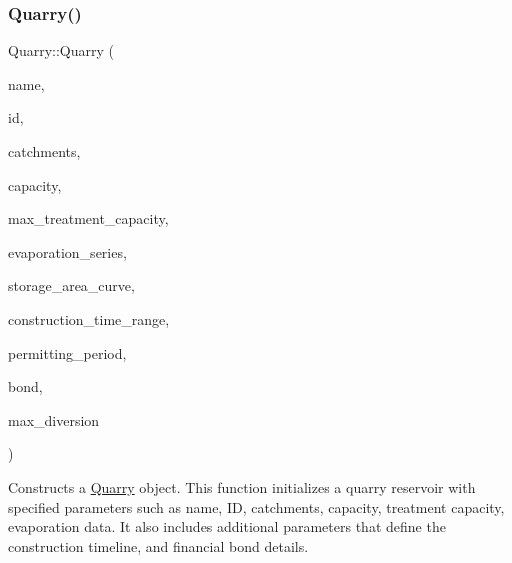 \subsubsection{\texorpdfstring{Quarry()}{Quarry()}\hspace{0.1cm}{\footnotesize\ttfamily [2/5]}}
{\footnotesize\ttfamily Quarry\+::\+Quarry (\begin{DoxyParamCaption}\item[{const char $\ast$}]{name,  }\item[{const int}]{id,  }\item[{const vector$<$ \mbox{\hyperlink{classCatchment}{Catchment}} $\ast$$>$ \&}]{catchments,  }\item[{const double}]{capacity,  }\item[{const double}]{max\+\_\+treatment\+\_\+capacity,  }\item[{\mbox{\hyperlink{classEvaporationSeries}{Evaporation\+Series}} \&}]{evaporation\+\_\+series,  }\item[{\mbox{\hyperlink{classDataSeries}{Data\+Series}} $\ast$}]{storage\+\_\+area\+\_\+curve,  }\item[{const vector$<$ double $>$ \&}]{construction\+\_\+time\+\_\+range,  }\item[{double}]{permitting\+\_\+period,  }\item[{\mbox{\hyperlink{classBond}{Bond}} \&}]{bond,  }\item[{double}]{max\+\_\+diversion }\end{DoxyParamCaption})}



Constructs a \mbox{\hyperlink{classQuarry}{Quarry}} object. This function initializes a quarry reservoir with specified parameters such as name, ID, catchments, capacity, treatment capacity, evaporation data. It also includes additional parameters that define the construction timeline, and financial bond details. 


